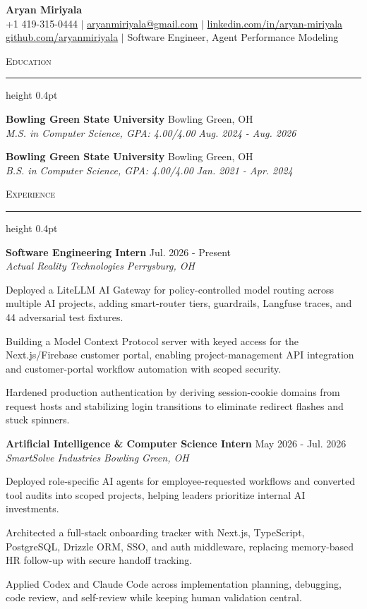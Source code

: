 \documentclass[letterpaper,11pt]{article}
\newcommand{\resumesection}[1]{%
  \par\vspace{2pt}%
  {\large\scshape #1}\par\vspace{2pt}%
  \hrule height 0.4pt\vspace{2pt}%
}
\newcommand{\resumeSubheading}[4]{
  \textbf{#1} \hfill #2\\
  \textit{#3} \hfill \textit{#4}
}
\begin{document}
\begin{center}
  {\LARGE \textbf{Aryan Miriyala}}\\[2pt]
  \small
  +1 419-315-0444 $|$ \href{mailto:aryanmiriyala@gmail.com}{aryanmiriyala@gmail.com} $|$ \href{https://www.linkedin.com/in/aryan-miriyala-7788a21b6/}{linkedin.com/in/aryan-miriyala}\\
  \href{https://github.com/aryanmiriyala}{github.com/aryanmiriyala} $|$ Software Engineer, Agent Performance Modeling
\end{center}\vspace{-6pt}

\resumesection{Education}
\resumeSubheading
{Bowling Green State University}{Bowling Green, OH}
{M.S. in Computer Science, GPA: 4.00/4.00}{Aug. 2024 - Aug. 2026}

\resumeSubheading
{Bowling Green State University}{Bowling Green, OH}
{B.S. in Computer Science, GPA: 4.00/4.00}{Jan. 2021 - Apr. 2024}

\resumesection{Experience}
\resumeSubheading
{Software Engineering Intern}{Jul. 2026 - Present}
{Actual Reality Technologies}{Perrysburg, OH}
\begin{tightitemize}
  \item Deployed a LiteLLM AI Gateway for policy-controlled model routing across multiple AI projects, adding smart-router tiers, guardrails, Langfuse traces, and 44 adversarial test fixtures.
  \item Building a Model Context Protocol server with keyed access for the Next.js/Firebase customer portal, enabling project-management API integration and customer-portal workflow automation with scoped security.
  \item Hardened production authentication by deriving session-cookie domains from request hosts and stabilizing login transitions to eliminate redirect flashes and stuck spinners.
\end{tightitemize}

\resumeSubheading
{Artificial Intelligence \& Computer Science Intern}{May 2026 - Jul. 2026}
{SmartSolve Industries}{Bowling Green, OH}
\begin{tightitemize}
  \item Deployed role-specific AI agents for employee-requested workflows and converted tool audits into scoped projects, helping leaders prioritize internal AI investments.
  \item Architected a full-stack onboarding tracker with Next.js, TypeScript, PostgreSQL, Drizzle ORM, SSO, and auth middleware, replacing memory-based HR follow-up with secure handoff tracking.
  \item Applied Codex and Claude Code across implementation planning, debugging, code review, and self-review while keeping human validation central.
\end{tightitemize}
\end{document}
